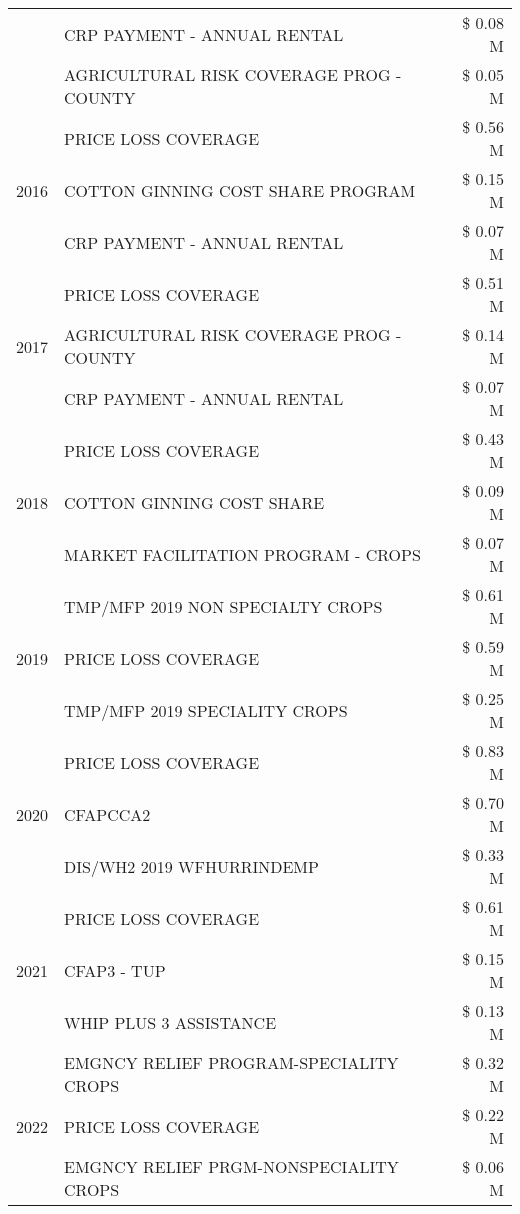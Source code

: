 \begin{tabular}{llr}
 & CRP PAYMENT - ANNUAL RENTAL & \$ 0.08 M \\
 & AGRICULTURAL RISK COVERAGE PROG - COUNTY & \$ 0.05 M \\
\cline{1-3}
\multirow[t]{3}{*}{2016} & PRICE LOSS COVERAGE & \$ 0.56 M \\
 & COTTON GINNING COST SHARE PROGRAM & \$ 0.15 M \\
 & CRP PAYMENT - ANNUAL RENTAL & \$ 0.07 M \\
\cline{1-3}
\multirow[t]{3}{*}{2017} & PRICE LOSS COVERAGE & \$ 0.51 M \\
 & AGRICULTURAL RISK COVERAGE PROG - COUNTY & \$ 0.14 M \\
 & CRP PAYMENT - ANNUAL RENTAL & \$ 0.07 M \\
\cline{1-3}
\multirow[t]{3}{*}{2018} & PRICE LOSS COVERAGE & \$ 0.43 M \\
 & COTTON GINNING COST SHARE & \$ 0.09 M \\
 & MARKET FACILITATION PROGRAM - CROPS & \$ 0.07 M \\
\cline{1-3}
\multirow[t]{3}{*}{2019} & TMP/MFP 2019 NON SPECIALTY CROPS & \$ 0.61 M \\
 & PRICE LOSS COVERAGE & \$ 0.59 M \\
 & TMP/MFP 2019 SPECIALITY CROPS & \$ 0.25 M \\
\cline{1-3}
\multirow[t]{3}{*}{2020} & PRICE LOSS COVERAGE & \$ 0.83 M \\
 & CFAPCCA2 & \$ 0.70 M \\
 & DIS/WH2 2019 WFHURRINDEMP & \$ 0.33 M \\
\cline{1-3}
\multirow[t]{3}{*}{2021} & PRICE LOSS COVERAGE & \$ 0.61 M \\
 & CFAP3 - TUP & \$ 0.15 M \\
 & WHIP PLUS 3 ASSISTANCE & \$ 0.13 M \\
\cline{1-3}
\multirow[t]{3}{*}{2022} & EMGNCY RELIEF PROGRAM-SPECIALITY CROPS & \$ 0.32 M \\
 & PRICE LOSS COVERAGE & \$ 0.22 M \\
 & EMGNCY RELIEF PRGM-NONSPECIALITY CROPS & \$ 0.06 M \\
\cline{1-3}
\bottomrule
\end{tabular}
